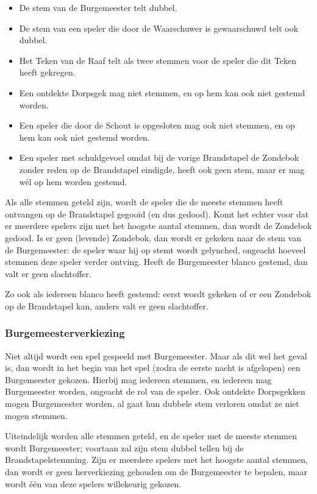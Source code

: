 \documentclass[12pt]{article}
\begin{document}
      \begin{itemize}
      	\item De stem van de Burgemeester telt dubbel.
      	\item De stem van een speler die door de Waarschuwer is gewaarschuwd telt ook dubbel.
      	\item Het Teken van de Raaf telt als twee stemmen voor de speler die dit Teken heeft gekregen.
      	\item Een ontdekte Dorpsgek mag niet stemmen, en op hem kan ook niet gestemd worden.
      	\item Een speler die door de Schout is opgesloten mag ook niet stemmen, en op hem kan ook niet gestemd worden.
      	\item Een speler met schuldgevoel omdat bij de vorige Brandstapel de Zondebok zonder reden op de Brandstapel eindigde, heeft ook geen stem, maar er mag w\'el op hem worden gestemd.
      \end{itemize}
      
      Als alle stemmen geteld zijn, wordt de speler die de meeste stemmen heeft ontvangen op de Brandstapel gegooid (en dus gedood). Komt het echter voor dat er meerdere spelers zijn met het hoogste aantal stemmen, dan wordt de Zondebok gedood. Is er geen (levende) Zondebok, dan wordt er gekeken naar de stem van de Burgemeester: de speler waar hij op stemt wordt gelynched, ongeacht hoeveel stemmen deze speler verder ontving. Heeft de Burgemeester blanco gestemd, dan valt er geen slachtoffer.
      
      Zo ook als iedereen blanco heeft gestemd: eerst wordt gekeken of er een Zondebok op de Brandstapel kan, anders valt er geen slachtoffer.

    \subsubsection{Burgemeesterverkiezing}
    
      Niet altijd wordt een spel gespeeld met Burgemeester. Maar als dit wel het geval is, dan wordt in het begin van het spel (zodra de eerste nacht is afgelopen) een Burgemeester gekozen. Hierbij mag iedereen stemmen, en iedereen mag Burgemeester worden, ongeacht de rol van de speler. Ook ontdekte Dorpsgekken mogen Burgemeester worden, al gaat hun dubbele stem verloren omdat ze niet mogen stemmen.
      
      Uiteindelijk worden alle stemmen geteld, en de speler met de meeste stemmen wordt Burgemeester; voortaan zal zijn stem dubbel tellen bij de Brandstapelstemming. Zijn er meerdere spelers met het hoogste aantal stemmen, dan wordt er geen herverkiezing gehouden om de Burgemeester te bepalen, maar wordt \'e\'en van deze spelers willekeurig gekozen.
      
\end{document}
